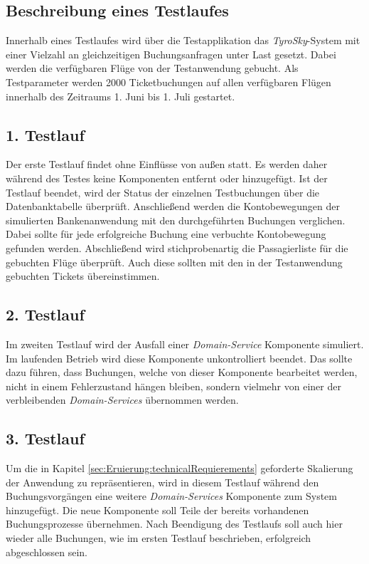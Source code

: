\subsection{Beschreibung eines Testlaufes}
Innerhalb eines Testlaufes wird über die Testapplikation das \textit{TyroSky}-System mit einer Vielzahl an gleichzeitigen Buchungsanfragen unter Last gesetzt. Dabei werden die verfügbaren Flüge von der Testanwendung gebucht. Als Testparameter werden {2000} Ticketbuchungen auf allen verfügbaren Flügen innerhalb des Zeitraums 1. Juni bis 1. Juli gestartet. \\

\subsection{1. Testlauf}
Der erste Testlauf findet ohne Einflüsse von außen statt. Es werden daher während des Testes keine Komponenten entfernt oder hinzugefügt. Ist der Testlauf beendet, wird der Status der einzelnen Testbuchungen über die Datenbanktabelle überprüft. Anschließend werden die Kontobewegungen der simulierten Bankenanwendung mit den durchgeführten Buchungen verglichen. Dabei sollte für jede erfolgreiche Buchung eine verbuchte Kontobewegung gefunden werden. Abschließend wird stichprobenartig die Passagierliste für die gebuchten Flüge überprüft. Auch diese sollten mit den in der Testanwendung gebuchten Tickets übereinstimmen. \\

\subsection{2. Testlauf}
Im zweiten Testlauf wird der Ausfall einer \textit{Domain-Service} Komponente simuliert. Im laufenden Betrieb wird diese Komponente unkontrolliert beendet. Das sollte dazu führen, dass Buchungen, welche von dieser Komponente bearbeitet werden, nicht in einem Fehlerzustand hängen bleiben, sondern vielmehr von einer der verbleibenden \textit{Domain-Services} übernommen werden. 

\subsection{3. Testlauf}
Um die in Kapitel \ref{sec:Eruierung:technicalRequierements} geforderte Skalierung der Anwendung zu repräsentieren, wird in diesem Testlauf während den Buchungsvorgängen eine weitere \textit{Domain-Services} Komponente zum System hinzugefügt. Die neue Komponente soll Teile der bereits vorhandenen Buchungsprozesse übernehmen. Nach Beendigung des Testlaufs soll auch hier wieder alle Buchungen, wie im ersten Testlauf beschrieben, erfolgreich abgeschlossen sein. 

